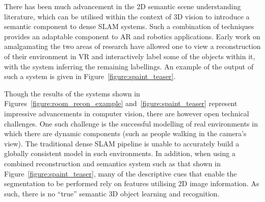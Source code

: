 There has been much advancement in the 2D semantic scene understanding literature, which can be utilised within 
the context of 3D vision to introduce a semantic component to dense SLAM systems. Such a combination of techniques 
provides an adaptable component to AR and robotics applications. Early work on amalgamating the two areas of research 
have allowed one to view a reconstruction of their environment in VR and interactively label some of the objects within 
it, with the system inferring the remaining labellings. An example of the output of such a system is given 
in Figure~\ref{figure:spaint_teaser}.

Though the results of the systems shown in Figures~\ref{figure:room_recon_example} and~\ref{figure:spaint_teaser} 
represent impressive advancements in computer vision, there are however open technical challenges. One such 
challenge is the successful modelling of real environments in which there are dynamic components (such as 
people walking in the camera's view). The traditional dense SLAM pipeline is unable to accurately build a 
globally consistent model in such environments. In addition, when using a combined reconstruction and 
semantics system such as that shown in Figure~\ref{figure:spaint_teaser}, many of the descriptive cues that 
enable the segmentation to be performed rely on features utilising 2D image information. As such, there is 
no ``true'' semantic 3D object learning and recognition. 


